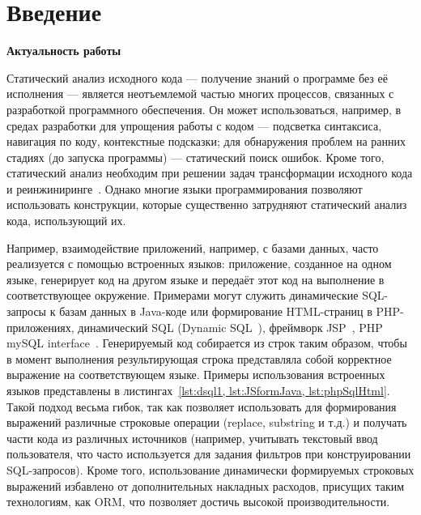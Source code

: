 \chapter*{Введение}							%
\textbf{Актуальность работы}

Статический анализ исходного кода --- получение знаний о программе без её исполнения --- является неотъемлемой частью многих процессов, связанных с разработкой программного обеспечения. Он может использоваться, например, в средах разработки для упрощения работы с кодом --- подсветка синтаксиса, навигация по коду, контекстные подсказки; для обнаружения проблем на ранних стадиях (до запуска программы) --- статический поиск ошибок.  Кроме того, статический анализ необходим при решении задач трансформации исходного кода и реинжиниринге~\cite{reeng}. Однако многие языки программирования позволяют использовать конструкции, которые существенно затрудняют статический анализ кода, использующий их.

Например, взаимодействие приложений, например, с базами данных, часто реализуется с помощью встроенных языков: приложение, созданное на одном языке, генерирует код на другом языке и передаёт этот код на выполнение в соответствующее окружение. Примерами могут служить динамические SQL-запросы к базам данных в Java-коде или формирование HTML-страниц в PHP-приложениях, динамический SQL (Dynamic SQL~\cite{DSQLISO}), фреймворк JSP~\cite{JSP}, PHP mySQL interface~\cite{PHPmySQL}. Генерируемый код собирается из строк таким образом, чтобы в момент выполнения результирующая строка представляла собой корректное выражение на соответствующем языке. Примеры использования встроенных языков представлены в листингах~\ref{lst:dsql1, lst:JSformJava, lst:phpSqlHtml}. Такой подход весьма гибок, так как позволяет использовать для формирования выражений различные строковые операции (replace, substring и т.д.) и получать части кода из различных источников (например, учитывать текстовый ввод пользователя, что часто используется для задания фильтров при конструировании SQL-запросов). Кроме того, использование динамически формируемых строковых выражений избавлено от  дополнительных накладных расходов, присущих таким технологиям, как ORM, что позволяет достичь высокой производительности.
% 

\

